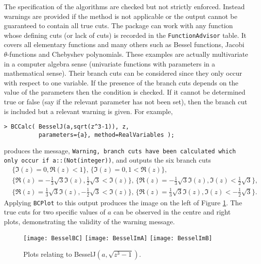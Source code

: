 \documentclass{llncs}
\begin{document}
The specification of the algorithms are checked but not strictly enforced.  Instead warnings are provided if the method is not applicable or the output cannot be guaranteed to contain all true cuts.  The package can work with any function whose defining cuts (or lack of cuts) is recorded in the \texttt{FunctionAdvisor} table.  It covers all elementary functions and many others such as Bessel functions, Jacobi $\theta$-functions and Chebyshev polynomials.  These examples are actually multivariate in a computer algebra sense (univariate functions with parameters in a mathematical sense).  Their branch cuts can be considered since they only occur with respect to one variable.  If the presence of the branch cuts depends on the value of the parameters then the condition is checked.  If it cannot be determined true or false (say if the relevant parameter has not been set), then the branch cut is included but a relevant warning is given.  
For example,
\begin{verbatim}
> BCCalc( BesselJ(a,sqrt(z^3-1)), z, 
          parameters={a}, method=RealVariables );
\end{verbatim}
produces the message, \verb+Warning, branch cuts have been calculated which+ \verb+only occur if a::(Not(integer))+,
and outputs the six branch cuts
\begin{eqnarray*}
&\{\Im(z) = 0, \Re(z) < 1\}, \, \{\Im(z) = 0, 1 < \Re(z)\}, \\
&\{\Re(z) = -\frac{1}{3}\sqrt{3}\Im(z), \frac{1}{2}\sqrt{3} < \Im(z)\}, \,
\{\Re(z) = -\frac{1}{3}\sqrt{3}\Im(z), \Im(z) < \frac{1}{2}\sqrt{3}\}, \\
&\{\Re(z) = \frac{1}{3}\sqrt{3}\Im(z), -\frac{1}{2}\sqrt{3} < \Im(z)\}, \,
\{\Re(z) = \frac{1}{3}\sqrt{3}\Im(z), \Im(z) < -\frac{1}{2}\sqrt{3}\}.
\end{eqnarray*}
Applying \texttt{BCPlot} to this output produces the image on the left of Figure \ref{fig:Bessel}.  The true cuts for two specific values of $a$ can be observed in the centre and right plots, demonstrating the validity of the warning message.

\begin{figure}[hb] 
\begin{center}
\texttt{[image: BesselBC]}
\hspace*{0.3cm}
\texttt{[image: BesselImA]}
\hspace*{0.3cm}
\texttt{[image: BesselImB]}
\end{center}
\caption{Plots relating to BesselJ$(a,\sqrt{z^3-1})$.} 
\label{fig:Bessel}
\end{figure}
\end{document}
